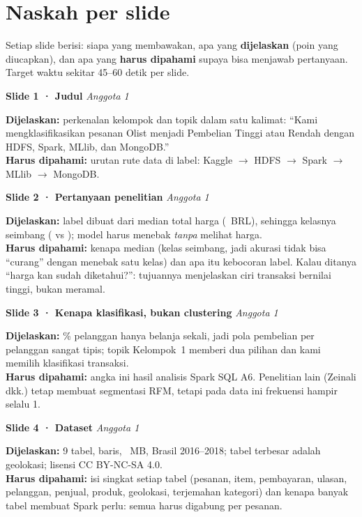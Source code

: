 \documentclass[11pt,a4paper]{article}
\begin{document}
\section{Naskah per slide}\label{sec:naskah}
Setiap slide berisi: siapa yang membawakan, apa yang \textbf{dijelaskan} (poin yang
diucapkan), dan apa yang \textbf{harus dipahami} supaya bisa menjawab pertanyaan. Target
waktu sekitar 45--60 detik per slide.

\newcommand{\slidenote}[4]{%
  \par\noindent\textbf{Slide #1 · #2} \hfill \textit{#3}\par
  \vspace{1pt}#4\par\vspace{6pt}}
\newcommand{\jelas}{\textbf{Dijelaskan:}}
\newcommand{\paham}{\textbf{Harus dipahami:}}

\slidenote{1}{Judul}{Anggota 1}{
\jelas{} perkenalan kelompok dan topik dalam satu kalimat: ``Kami mengklasifikasikan
pesanan Olist menjadi Pembelian Tinggi atau Rendah dengan HDFS, Spark, MLlib, dan MongoDB.''\\
\paham{} urutan rute data di label: Kaggle $\rightarrow$ HDFS $\rightarrow$ Spark
$\rightarrow$ MLlib $\rightarrow$ MongoDB.}

\slidenote{2}{Pertanyaan penelitian}{Anggota 1}{
\jelas{} label dibuat dari median total harga (\ambang{}~BRL), sehingga kelasnya seimbang
(\nTinggi{} vs \nRendah); model harus menebak \emph{tanpa} melihat harga.\\
\paham{} kenapa median (kelas seimbang, jadi akurasi tidak bisa ``curang'' dengan menebak
satu kelas) dan apa itu kebocoran label. Kalau ditanya ``harga kan sudah diketahui?'':
tujuannya menjelaskan ciri transaksi bernilai tinggi, bukan meramal.}

\slidenote{3}{Kenapa klasifikasi, bukan clustering}{Anggota 1}{
\jelas{} \oneTimePct\% pelanggan hanya belanja sekali, jadi pola pembelian per pelanggan
sangat tipis; topik Kelompok~1 memberi dua pilihan dan kami memilih klasifikasi transaksi.\\
\paham{} angka ini hasil analisis Spark SQL A6. Penelitian lain (Zeinali dkk.) tetap
membuat segmentasi RFM, tetapi pada data ini frekuensi hampir selalu 1.}

\slidenote{4}{Dataset}{Anggota 1}{
\jelas{} 9 tabel, \rawRows{} baris, \rawSizeMB{}~MB, Brasil 2016--2018; tabel terbesar
adalah geolokasi; lisensi CC BY-NC-SA 4.0.\\
\paham{} isi singkat setiap tabel (pesanan, item, pembayaran, ulasan, pelanggan, penjual,
produk, geolokasi, terjemahan kategori) dan kenapa banyak tabel membuat Spark perlu: semua
harus digabung per pesanan.}
\end{document}
